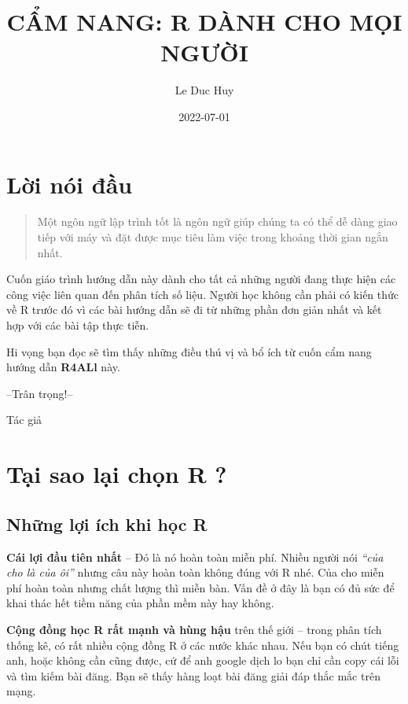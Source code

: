 \documentclass[
]{book}
\title{CẨM NANG: R DÀNH CHO MỌI NGƯỜI}
\author{Le Duc Huy}
\date{2022-07-01}
\theoremstyle{definition}
\theoremstyle{definition}
\theoremstyle{definition}
\theoremstyle{definition}
\theoremstyle{remark}
\begin{document}
\maketitle

{
\setcounter{tocdepth}{1}
\tableofcontents
}
\hypertarget{lux1eddi-nuxf3i-ux111ux1ea7u}{%
\chapter{Lời nói đầu}\label{lux1eddi-nuxf3i-ux111ux1ea7u}}

\begin{quote}
Một ngôn ngữ lập trình tốt là ngôn ngữ giúp chúng ta có thể dễ dàng giao tiếp với máy và đặt được mục tiêu làm việc trong khoảng thời gian ngắn nhất.
\end{quote}

Cuốn giáo trình hướng dẫn này dành cho tất cả những người đang thực hiện các công việc liên quan đến phân tích số liệu. Người học không cần phải có kiến thức về R trước đó vì các bài hướng dẫn sẽ đi từ những phần đơn giản nhất và kết hợp với các bài tập thực tiễn.

Hi vọng bạn đọc sẽ tìm thấy những điều thú vị và bổ ích từ cuốn cẩm nang hướng dẫn \textbf{R4ALl} này.

--Trân trọng!--

Tác giả

\hypertarget{tux1ea1i-sao-lux1ea1i-chux1ecdn-r}{%
\chapter{Tại sao lại chọn R ?}\label{tux1ea1i-sao-lux1ea1i-chux1ecdn-r}}

\hypertarget{nhux1eefng-lux1ee3i-uxedch-khi-hux1ecdc-r}{%
\section{Những lợi ích khi học R}\label{nhux1eefng-lux1ee3i-uxedch-khi-hux1ecdc-r}}

\textbf{Cái lợi đầu tiên nhất} -- Đó là nó hoàn toàn miễn phí. Nhiều người nói \emph{``của cho là của ôi''} nhưng câu này hoàn toàn không đúng với R nhé. Của cho miễn phí hoàn toàn nhưng chất lượng thì miễn bàn. Vấn đề ở đây là bạn có đủ sức để khai thác hết tiềm năng của phần mềm này hay không.

\textbf{Cộng đồng học R rất mạnh và hùng hậu} trên thế giới -- trong phân tích thống kê, có rất nhiều cộng đồng R ở các nước khác nhau. Nếu bạn có chút tiếng anh, hoặc không cần cũng được, cứ để anh google dịch lo bạn chỉ cần copy cái lỗi và tìm kiếm bài đăng. Bạn sẽ thấy hàng loạt bài đăng giải đáp thắc mắc trên mạng.
\end{document}
